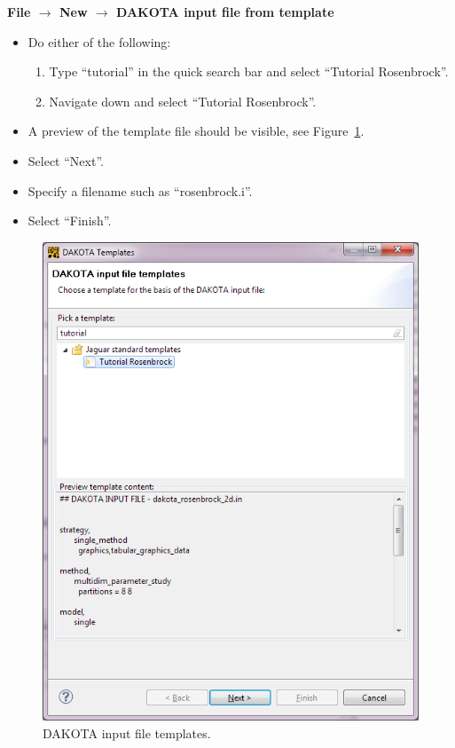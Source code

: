 {\bf File $\rightarrow$ New $\rightarrow$ DAKOTA input file from template}
\begin{itemize}
\item Do either of the following:
\begin{enumerate}
\item Type ``tutorial'' in the quick search bar and select ``Tutorial Rosenbrock''.
\item Navigate down and select ``Tutorial Rosenbrock''.
\end{enumerate}
\item A preview of the template file should be visible, see Figure~\ref{fig:input:1tutorial}.
\item Select ``Next''.
\item Specify a filename such as ``rosenbrock.i''.
\item Select ``Finish''.
\end{itemize}
\begin{figure}[htbp]
  \centering
  \includegraphics[scale=0.6]{images/1tutorial}
  \caption{DAKOTA input file templates.}
  \label{fig:input:1tutorial}
\end{figure}


